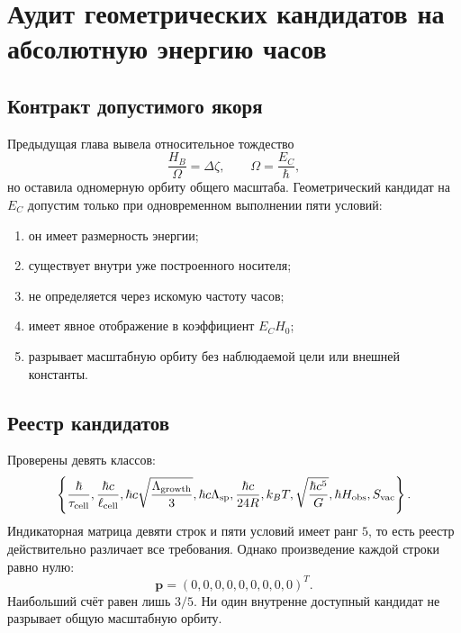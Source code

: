 \chapter{Аудит геометрических кандидатов на абсолютную энергию часов}
\label{ch:v10-cell-birth-clock-energy-geometric-anchor-audit}

\section{Контракт допустимого якоря}

Предыдущая глава вывела относительное тождество
\begin{equation}
 \frac{H_B}{\Omega}=\Delta\zeta,
 \qquad \Omega=\frac{E_C}{\hbar},
 \label{eq:v10-anchor-relative-growth}
\end{equation}
но оставила одномерную орбиту общего масштаба. Геометрический кандидат на
$E_C$ допустим только при одновременном выполнении пяти условий:
\begin{enumerate}
\item он имеет размерность энергии;
\item существует внутри уже построенного носителя;
\item не определяется через искомую частоту часов;
\item имеет явное отображение в коэффициент $E_C H_0$;
\item разрывает масштабную орбиту без наблюдаемой цели или внешней константы.
\end{enumerate}

\section{Реестр кандидатов}

Проверены девять классов:
\begin{equation}
 \left\{
 \frac{\hbar}{\tau_{\rm cell}},
 \frac{\hbar c}{\ell_{\rm cell}},
 \hbar c\sqrt{\frac{\Lambda_{\rm growth}}3},
 \hbar c\Lambda_{\rm sp},
 \frac{\hbar c}{24R},
 k_BT,
 \sqrt{\frac{\hbar c^5}{G}},
 \hbar H_{\rm obs},
 S_{\rm vac}
 \right\}.
 \label{eq:v10-anchor-candidate-menu}
\end{equation}
Индикаторная матрица девяти строк и пяти условий имеет ранг $5$, то есть
реестр действительно различает все требования. Однако произведение каждой
строки равно нулю:
\begin{equation}
 \mathbf p=(0,0,0,0,0,0,0,0,0)^T.
 \label{eq:v10-anchor-pass-vector}
\end{equation}
Наибольший счёт равен лишь $3/5$. Ни один внутренне доступный кандидат не
разрывает общую масштабную орбиту.


